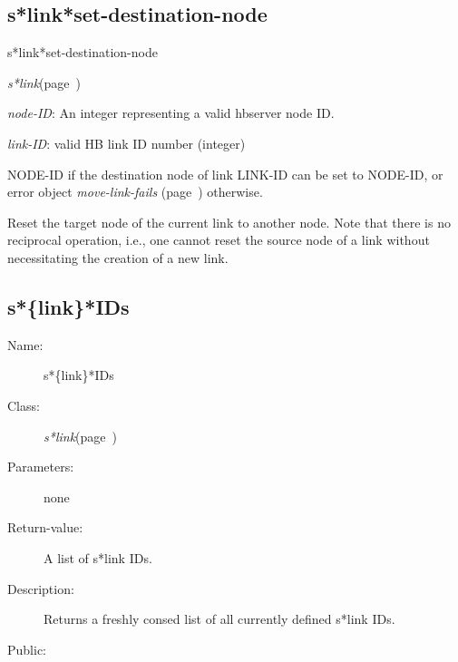 \subsection{s*link*set-destination-node}
\label{s*link*set-destination-node}

\begin{description}
\item [Name:]  s*link*set-destination-node

\item [Class:]
{\sl s*link}\hfill(page~\pageref{s*link})

\item [Parameters:]
\item {\sl node-ID}:   An integer representing
a valid hbserver node ID.

\item {\sl link-ID}:  
valid HB link ID number (integer)


\item [Return-value:]
NODE-ID if the destination node of link LINK-ID can be
set to NODE-ID, or error object {\sl move-link-fails} (page~\pageref{move-link-fails})
otherwise. 

\item [Description:]
Reset the target node of the current link to another
node. Note that there is no reciprocal operation,
i.e., one cannot reset the source node of a link
without necessitating the creation of a new link.

\item [Public:]



\end{description}
\horizontalline

\subsection{s*\{link\}*IDs}
\label{s*link*IDs}

\begin{description}
\item [Name:]  s*\{link\}*IDs

\item [Class:] {\sl s*link}\hfill(page~\pageref{s*link})

\item [Parameters:] none

\item [Return-value:]

A list of s*link IDs.

\item [Description:]

Returns a freshly consed list of all currently
defined s*link IDs.

\item [Public:]



\end{description}
\horizontalline

